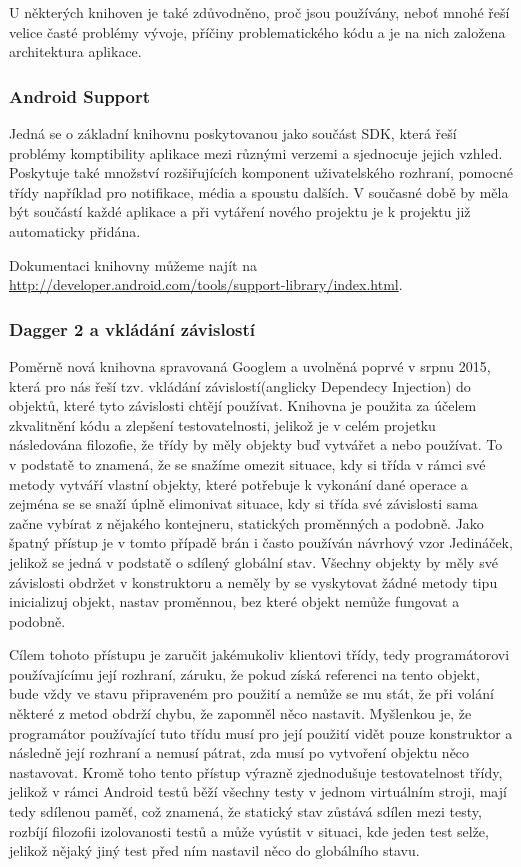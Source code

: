 \documentclass{article}
\begin{document}
U některých knihoven je také zdůvodněno, proč jsou používány,
neboť mnohé řeší velice časté problémy vývoje, příčiny problematického kódu a je na nich založena
architektura aplikace.

\subsubsection{Android Support}\label{androidsupport}
Jedná se o základní knihovnu poskytovanou jako součást SDK, která řeší problémy komptibility aplikace
mezi různými verzemi a sjednocuje jejich vzhled. Poskytuje také množství rozšiřujících komponent uživatelského rozhraní,
pomocné třídy například pro notifikace, média a spoustu dalších. V současné době by měla být součástí každé
aplikace a při vytáření nového projektu je k projektu již automaticky přidána.

Dokumentaci knihovny můžeme najít na \url{http://developer.android.com/tools/support-library/index.html}.

\subsubsection{Dagger 2 a vkládání závislostí}\label{dagger2}
Poměrně nová knihovna spravovaná Googlem a uvolněná poprvé v srpnu 2015, která pro nás řeší tzv. vkládání
závislostí(anglicky Dependecy Injection) do objektů,
které tyto závislosti chtějí používat. Knihovna je použita za účelem zkvalitnění kódu a zlepšení testovatelnosti, jelikož
je v celém projetku následována filozofie, že třídy by měly objekty buď vytvářet a nebo používat. To v podstatě to znamená,
že se snažíme omezit situace, kdy si třída v rámci své metody vytváří vlastní objekty, které potřebuje k vykonání
dané operace a zejména se se snaží úplně elimonivat situace, kdy si třída své závislosti sama začne vybírat z nějakého
kontejneru, statických proměnných a podobně. Jako špatný přístup je v tomto případě brán i často používán návrhový vzor
Jedináček, jelikož se jedná v podstatě o sdílený globální stav. Všechny objekty by měly své závislosti obdržet v konstruktoru
a neměly by se vyskytovat žádné metody tipu inicializuj objekt, nastav proměnnou, bez které objekt nemůže fungovat a podobně.

Cílem tohoto přístupu je zaručit jakémukoliv klientovi třídy, tedy programátorovi používajícímu její rozhraní,
záruku, že pokud získá referenci na tento objekt, bude vždy ve stavu připraveném pro použití a nemůže se mu stát,
že při volání některé z metod obdrží chybu, že zapomněl něco nastavit. Myšlenkou je, že programátor používající
tuto třídu musí pro její použití vidět pouze konstruktor a následně její rozhraní a nemusí pátrat, zda musí po
vytvoření objektu něco nastavovat. Kromě toho tento přístup výrazně zjednodušuje testovatelnost třídy, jelikož v rámci
Android testů běží všechny testy v jednom virtuálním stroji, mají tedy sdílenou paměť, což znamená, že statický
stav zůstává sdílen mezi testy, rozbíjí filozofii izolovanosti testů a může vyústit v situaci, kde jeden test selže,
jelikož nějaký jiný test před ním nastavil něco do globálního stavu.
\end{document}
